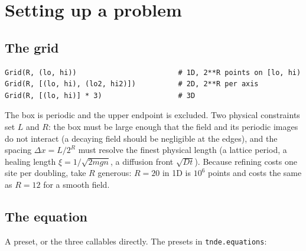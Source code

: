 \documentclass[11pt,a4paper]{article}
\newcommand{\code}[1]{\texttt{#1}}
\begin{document}
\section{Setting up a problem}
\label{sec:setup}

\subsection{The grid}
\begin{lstlisting}
Grid(R, (lo, hi))                        # 1D, 2**R points on [lo, hi)
Grid(R, [(lo, hi), (lo2, hi2)])          # 2D, 2**R per axis
Grid(R, [(lo, hi)] * 3)                  # 3D
\end{lstlisting}
The box is periodic and the upper endpoint is excluded. Two physical constraints set
$L$ and $R$: the box must be large enough that the field and its periodic images do not
interact (a decaying field should be negligible at the edges), and the spacing
$\Delta x=L/2^R$ must resolve the finest physical length (a lattice period, a healing
length $\xi=1/\sqrt{2mgn}$, a diffusion front $\sqrt{Dt}$). Because refining costs one
site per doubling, take $R$ generous: $R=20$ in 1D is $10^6$ points and costs the same
as $R=12$ for a smooth field.

\subsection{The equation}

A preset, or the three callables directly. The presets in \code{tnde.equations}:
\end{document}
